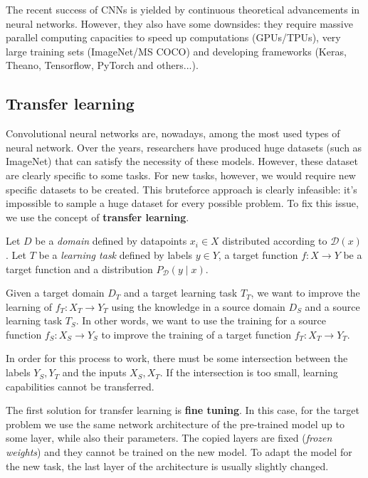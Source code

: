 \documentclass[a4paper, 12pt]{report}
\begin{document}
    The recent success of CNNs is yielded by continuous theoretical advancements in neural networks. However, they also have some downsides: they require massive parallel computing capacities to speed up computations (GPUs/TPUs), very large training sets (ImageNet/MS COCO) and developing frameworks (Keras, Theano, Tensorflow, PyTorch and others...). %

    \subsection{Transfer learning}

    Convolutional neural networks are, nowadays, among the most used types of neural network. Over the years, researchers have produced huge datasets (such as ImageNet) that can satisfy the necessity of these models. However, these dataset are clearly specific to some tasks. For new tasks, however, we would require new specific datasets to be created. This bruteforce approach is clearly infeasible: it's impossible to sample a huge dataset for every possible problem. To fix this issue, we use the concept of \textbf{transfer learning}.
    
    Let $D$ be a \textit{domain} defined by datapoints $x_i \in X$ distributed according to $\mathcal{D}(x)$. Let $T$ be a \textit{learning task} defined by labels $y \in Y$, a target function $f : X \to Y$ be a target function and a distribution $P_\mathcal{D}(y \mid x)$.

    Given a target domain $D_T$ and a target learning task $T_T$, we want to improve the learning of $f_T : X_T \to Y_T$ using the knowledge in a source domain $D_S$ and a source learning task $T_S$. In other words, we want to use the training for a source function $f_S : X_S \to Y_S$ to improve the training of a target function $f_T : X_T \to Y_T$.

    In order for this process to work, there must be some intersection between the labels $Y_S, Y_T$ and the inputs $X_S, X_T$. If the intersection is too small, learning capabilities cannot be transferred.

    The first solution for transfer learning is \textbf{fine tuning}. In this case, for the target problem we use the same network architecture of the pre-trained model up to some layer, while also  their parameters. The copied layers are fixed (\textit{frozen weights}) and they cannot be trained on the new model. To adapt the model for the new task, the last layer of the architecture is usually slightly changed.
\end{document}
